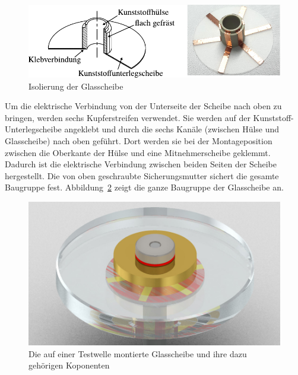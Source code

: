 \begin{figure}[htb]
    \centering
    \includegraphics[]{./images/isolierung_der_scheibe.pdf}
    \caption{Isolierung der Glasscheibe}
    \label{fig:isolierung_der_glassscheibe}
\end{figure}

Um die elektrische Verbindung von der Unterseite der Scheibe nach oben zu bringen, werden sechs Kupferstreifen verwendet.
Sie werden auf der Kunststoff-Unterlegscheibe angeklebt und durch die sechs Kanäle (zwischen Hülse und Glasscheibe) nach oben geführt.
Dort werden sie bei der Montageposition zwischen die Oberkante der Hülse und eine Mitnehmerscheibe geklemmt.
Dadurch ist die elektrische Verbindung zwischen beiden Seiten der Scheibe hergestellt.
Die von oben geschraubte Sicherungsmutter sichert die gesamte Baugruppe fest.
Abbildung~\ref{fig:glasscheibebaugruppe} zeigt die ganze Baugruppe der Glasscheibe an.

\begin{figure}[htb]
    \centering
    \includegraphics[width=0.7\linewidth]{./images/glasscheibe_asm.jpg}
    \caption{Die auf einer Testwelle montierte Glasscheibe und ihre dazu gehörigen Koponenten}
    \label{fig:glasscheibebaugruppe}
\end{figure}

